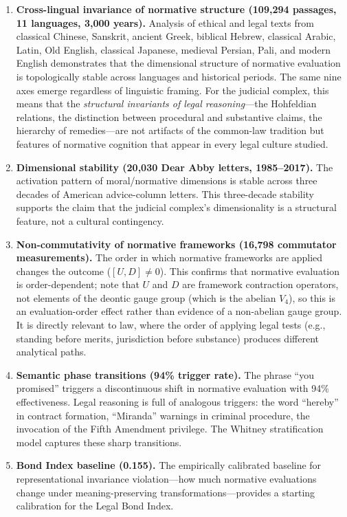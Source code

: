 \documentclass[12pt]{article}
\theoremstyle{definition}
\theoremstyle{remark}
\begin{document}
\begin{enumerate}
    \item \textbf{Cross-lingual invariance of normative structure (109,294 passages, 11 languages, 3,000 years).}  Analysis of ethical and legal texts from classical Chinese, Sanskrit, ancient Greek, biblical Hebrew, classical Arabic, Latin, Old English, classical Japanese, medieval Persian, Pali, and modern English demonstrates that the dimensional structure of normative evaluation is topologically stable across languages and historical periods.  The same nine axes emerge regardless of linguistic framing.  For the judicial complex, this means that the \emph{structural invariants of legal reasoning}---the Hohfeldian relations, the distinction between procedural and substantive claims, the hierarchy of remedies---are not artifacts of the common-law tradition but features of normative cognition that appear in every legal culture studied.

    \item \textbf{Dimensional stability (20,030 Dear Abby letters, 1985--2017).}  The activation pattern of moral/normative dimensions is stable across three decades of American advice-column letters.  This three-decade stability supports the claim that the judicial complex's dimensionality is a structural feature, not a cultural contingency.

    \item \textbf{Non-commutativity of normative frameworks (16,798 commutator measurements).}  The order in which normative frameworks are applied changes the outcome ($[U, D] \neq 0$).  This confirms that normative evaluation is order-dependent; note that $U$ and $D$ are framework contraction operators, not elements of the deontic gauge group (which is the abelian $V_4$), so this is an evaluation-order effect rather than evidence of a non-abelian gauge group.  It is directly relevant to law, where the order of applying legal tests (e.g., standing before merits, jurisdiction before substance) produces different analytical paths.

    \item \textbf{Semantic phase transitions (94\% trigger rate).}  The phrase ``you promised'' triggers a discontinuous shift in normative evaluation with 94\% effectiveness.  Legal reasoning is full of analogous triggers: the word ``hereby'' in contract formation, ``Miranda'' warnings in criminal procedure, the invocation of the Fifth Amendment privilege.  The Whitney stratification model captures these sharp transitions.

    \item \textbf{Bond Index baseline (0.155).}  The empirically calibrated baseline for representational invariance violation---how much normative evaluations change under meaning-preserving transformations---provides a starting calibration for the Legal Bond Index.
\end{enumerate}
\end{document}
